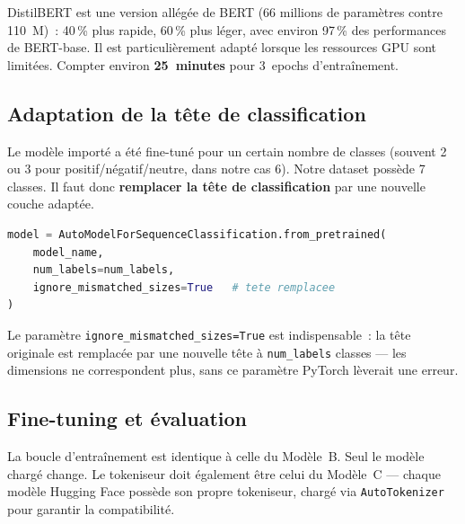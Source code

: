 \documentclass[12pt,a4paper]{article}
\begin{document}
\begin{tipbox}
DistilBERT est une version allégée de BERT (66 millions de paramètres contre 110~M)~:
40\,\% plus rapide, 60\,\% plus léger, avec environ 97\,\% des performances de
BERT-base. Il est particulièrement adapté lorsque les ressources GPU sont limitées.
Compter environ \textbf{25~minutes} pour 3~epochs d'entraînement.
\end{tipbox}

\subsection{Adaptation de la tête de classification}

Le modèle importé a été fine-tuné pour un certain nombre de classes (souvent 2 ou 3
pour positif/négatif/neutre, dans notre cas 6). Notre dataset possède 7 classes. Il faut donc
\textbf{remplacer la tête de classification} par une nouvelle couche adaptée.

\begin{lstlisting}[language=Python]
model = AutoModelForSequenceClassification.from_pretrained(
    model_name,
    num_labels=num_labels,
    ignore_mismatched_sizes=True   # tete remplacee
)
\end{lstlisting}

Le paramètre \texttt{ignore\_mismatched\_sizes=True} est indispensable~: la tête
originale est remplacée par une nouvelle tête à \texttt{num\_labels}
classes — les dimensions ne correspondent plus, sans ce paramètre PyTorch lèverait
une erreur.

\subsection{Fine-tuning et évaluation}

La boucle d'entraînement est identique à celle du Modèle~B. Seul le modèle chargé
change. Le tokeniseur doit également être celui du Modèle~C — chaque modèle Hugging
Face possède son propre tokeniseur, chargé via \texttt{AutoTokenizer} pour garantir la
compatibilité.
\end{document}
